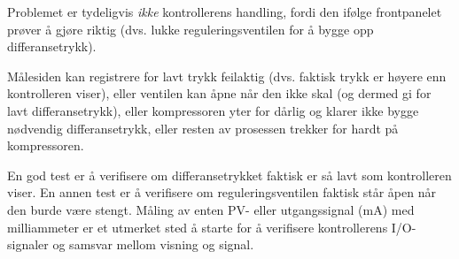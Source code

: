 Problemet er tydeligvis {\it ikke} kontrollerens handling, fordi den ifølge frontpanelet prøver å gjøre riktig (dvs. lukke reguleringsventilen for å bygge opp differansetrykk).







Målesiden kan registrere for lavt trykk feilaktig (dvs. faktisk trykk er høyere enn kontrolleren viser), eller ventilen kan åpne når den ikke skal (og dermed gi for lavt differansetrykk), eller kompressoren yter for dårlig og klarer ikke bygge nødvendig differansetrykk, eller resten av prosessen trekker for hardt på kompressoren.

\vskip 10pt

En god test er å verifisere om differansetrykket faktisk er så lavt som kontrolleren viser.  En annen test er å verifisere om reguleringsventilen faktisk står åpen når den burde være stengt.  Måling av enten PV- eller utgangssignal (mA) med milliammeter er et utmerket sted å starte for å verifisere kontrollerens I/O-signaler og samsvar mellom visning og signal.


